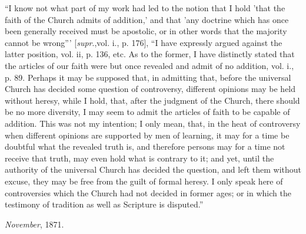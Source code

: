 ``I know not what part of my work had led to the
notion that I hold 'that the faith of the Church admits of addition,'
and that 'any doctrine which has once been generally received must be
apostolic, or in other words that the majority cannot be wrong'''
[\emph{supr}.,\emph{}vol. i., p. 176], ``I have expressly argued against the latter
position, vol. ii, p. 136, etc. As to the former, I have distinctly
stated that the articles of our faith were but once revealed and admit
of no addition, vol. i., p. 89. Perhaps it may be supposed that, in
admitting that, before the universal Church has decided some question
of controversy, different opinions may be held without heresy, while I
hold, that, after the judgment of the Church, there should be no more
diversity, I may seem to admit the articles of faith to be capable of
addition. This was not my intention; I only mean, that, in
the heat of controversy when different opinions are supported
by men of learning, it may for a time be doubtful what the revealed
truth is, and therefore persons may for a time not receive that truth,
may even hold what is contrary to it; and yet, until the authority of
the universal Church has decided the question, and left them without
excuse, they may be free from the guilt of formal heresy. I only speak
here of controversies which the Church had not decided in former ages;
or in which the testimony of tradition as well as Scripture is
disputed.''

\emph{November}, 1871.
